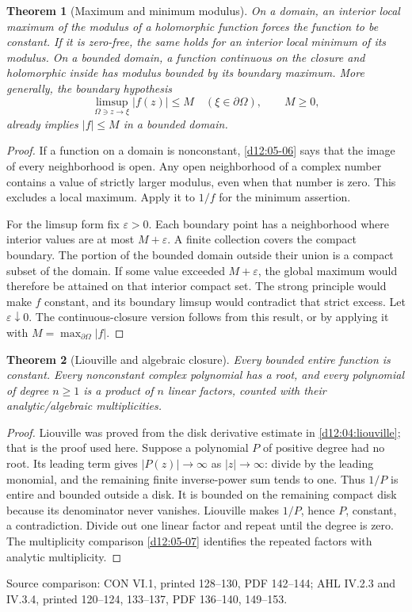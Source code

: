 \documentclass[11pt,a4paper,openany]{book}
\newtheorem{theorem}{Theorem}[chapter]
\theoremstyle{definition}
\theoremstyle{remark}\newtheorem{remark}[theorem]{Remark}
\newcommand{\eps}{\varepsilon}\newcommand{\ee}{\varepsilon}
\newcommand{\family}[1]{}
\newcommand{\source}[1]{\par\begingroup\small\sffamily\color{black!65}Source comparison: #1\par\endgroup}
\begin{document}
\begin{theorem}[Maximum and minimum modulus]\family{D12.06.01}\label{d12:06-01}
On a domain, an interior local maximum of the modulus of a holomorphic
function forces the function to be constant. If it is zero-free, the
same holds for an interior local minimum of its modulus.
On a bounded domain, a function continuous on the closure and holomorphic
inside has modulus bounded by its boundary maximum.
More generally, the boundary hypothesis
\[
 \limsup_{\Omega\ni z\to\xi}|f(z)|\le M
 \quad(\xi\in\partial\Omega),\qquad M\ge0,
\]
already implies \(|f|\le M\) in a bounded domain.
\end{theorem}
\begin{proof}
If a function on a domain is nonconstant, \cref{d12:05-06} says that
the image of every neighborhood is open. Any open neighborhood of a
complex number contains a value of strictly larger modulus, even when
that number is zero. This excludes a local maximum. Apply it to \(1/f\)
for the minimum assertion.

For the limsup form fix \(\eps>0\). Each boundary point has a neighborhood
where interior values are at most \(M+\eps\).
A finite collection covers the compact boundary.
The portion of the bounded domain outside their union is a compact
subset of the domain. If some value exceeded \(M+\eps\), the global
maximum would therefore be attained on that interior compact set.
The strong principle would make \(f\) constant, and its boundary limsup
would contradict that strict excess. Let \(\eps\downarrow0\).
The continuous-closure version follows from this result, or by applying
it with \(M=\max_{\partial\Omega}|f|\).
\end{proof}

\begin{theorem}[Liouville and algebraic closure]\family{D12.06.02}\label{d12:06-02}
Every bounded entire function is constant. Every nonconstant complex
polynomial has a root, and every polynomial of degree \(n\ge1\) is a
product of \(n\) linear factors, counted with their analytic/algebraic
multiplicities.
\end{theorem}
\begin{proof}
Liouville was proved from the disk derivative estimate in
\cref{d12:04:liouville}; that is the proof used here.
Suppose a polynomial \(P\) of positive degree had no root.
Its leading term gives \(|P(z)|\to\infty\) as \(|z|\to\infty\):
divide by the leading monomial, and the remaining finite inverse-power
sum tends to one. Thus \(1/P\) is entire and bounded outside a disk.
It is bounded on the remaining compact disk because its denominator
never vanishes. Liouville makes \(1/P\), hence \(P\), constant, a
contradiction. Divide out one linear factor and repeat until the degree
is zero. The multiplicity comparison \cref{d12:05-07} identifies the
repeated factors with analytic multiplicity.
\end{proof}
\source{CON VI.1, printed 128--130, PDF 142--144; AHL IV.2.3 and IV.3.4, printed 120--124, 133--137, PDF 136--140, 149--153.}
\end{document}
